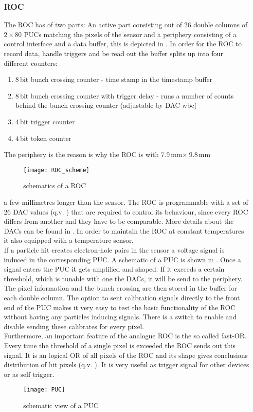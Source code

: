 \subsubsection{\ac{ROC}}\label{sroc}
The \ac{ROC} has of two parts: An active part consisting out of $26$ double columns of $2\times80$ \ac{PUC}s matching the pixels of the sensor and a periphery consisting of a control interface and a data buffer, this is depicted in . In order for the \ac{ROC} to record data, handle triggers and be read out the buffer splits up into four different counters:
\begin{enumerate}
	\item $8\,$bit bunch crossing counter - time stamp in the timestamp buffer
	\item $8\,$bit bunch crossing counter with trigger delay - runs a number of counts behind the bunch crossing counter (adjustable by \ac{DAC} wbc)
	\item $4\,$bit trigger counter
	\item $4\,$bit token counter
\end{enumerate}\par
The periphery is the reason is why the \ac{ROC} is with $7.9\,$mm$\times\ 9.8\,$mm 
\begin{wrapfigure}{l}{8cm}
	\texttt{[image: ROC\_scheme]}
	\caption{schematics of a \ac{ROC} \cite{psi46chip}}
	\label{p8}
\end{wrapfigure}  
a few millimetres longer than the sensor. The \ac{ROC} is programmable with a set of  $26$ \ac{DAC} values (q.v. ) that are required to control its behaviour, since every \ac{ROC} differs from another and they have to be comparable. More details about the \ac{DAC}s can be found in . In order to maintain the \ac{ROC} at constant temperatures it also equipped with a temperature sensor.\\
If a particle hit creates electron-hole pairs in the sensor a voltage signal is induced in the corresponding \ac{PUC}. A schematic of a \ac{PUC} is shown in . Once a signal enters the \ac{PUC} it gets amplified and shaped. If it exceeds a certain threshold, which is tunable with one the \ac{DAC}s, it will be send to the periphery. The pixel information and the bunch crossing are then stored in the buffer for each double column. The option to sent calibration signals directly to the front end of the \ac{PUC} makes it very easy to test the basic functionality of the \ac{ROC} without having any particles inducing signals. There is a switch to enable and disable sending these calibrates for every pixel.\\
Furthermore, an important feature of the analogue \ac{ROC} is the so called fast-OR. Every time the threshold of a single pixel is exceeded the \ac{ROC} sends out this signal. It is an logical OR of all pixels of the \ac{ROC} and its shape gives conclusions distribution of hit pixels (q.v. ). It is very useful as trigger signal for other devices or as self trigger.
\begin{figure}[ht]
	\texttt{[image: PUC]}
	\caption{schematic view of a \ac{PUC} \cite{dambach}}
	\label{p9}
\end{figure}
